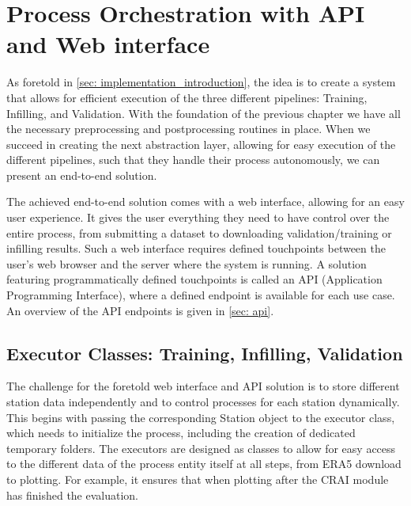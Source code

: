\section{Process Orchestration with API and Web interface}
\label{sec: process_orchestration}

As foretold in \autoref{sec: implementation_introduction}, the idea is to create a system that allows for efficient execution of the three different pipelines: Training, Infilling, and Validation.
With the foundation of the previous chapter we have all the necessary preprocessing and postprocessing routines in place.
When we succeed in creating the next abstraction layer, allowing for easy execution of the different pipelines, such that they handle their process autonomously, we can present an end-to-end solution.

The achieved end-to-end solution comes with a web interface, allowing for an easy user experience.
It gives the user everything they need to have control over the entire process, from submitting a dataset to downloading validation/training or infilling results.
Such a web interface requires defined touchpoints between the user's web browser and the server where the system is running.
A solution featuring programmatically defined touchpoints is called an API (Application Programming Interface), where a defined endpoint is available for each use case.
An overview of the API endpoints is given in \autoref{sec: api}. 

\subsection{Executor Classes: Training, Infilling, Validation}

The challenge for the foretold web interface and API solution is to store different station data independently and to control processes for each station dynamically.
This begins with passing the corresponding Station object to the executor class, which needs to initialize the process, including the creation of dedicated temporary folders.
The executors are designed as classes to allow for easy access to the different data of the process entity itself at all steps, from ERA5 download to plotting. For example, it ensures that when plotting after the CRAI module has finished the evaluation.

